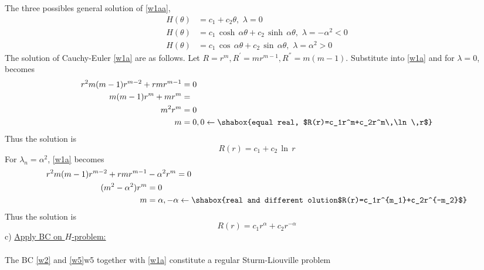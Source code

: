 The three possibles general solution of \eqref{w1aa},
\begin{align}
H(\theta)&=c_1+c_2\theta,\,\,\lambda=0\label{w1ab}\\
H(\theta)&=c_1\,\cosh\,\alpha\theta+c_2\,\sinh\,\alpha\theta,\,\,\lambda=-\alpha^2<0\label{w1ac}\\
H(\theta)&=c_1\,\cos\,\alpha\theta+c_2\,\sin\,\alpha\theta,\,\,\lambda=\alpha^2>0\label{w1ad}
\end{align}
The solution of Cauchy-Euler \eqref{w1a} are as follows. Let $R=r^m, R^{'}=mr^{m-1}, R^{''}=m(m-1)$. Substitute into \eqref{w1a} and for $\lambda=0$, becomes
\begin{align*}
r^2m(m-1)r^{m-2}+rmr^{m-1}&=0\\
m(m-1)r^m+mr^{m}&=\\
m^2r^m&=0\\
m&=0,0\leftarrow\shabox{equal real, $R(r)=c_1r^m+c_2r^m\,\ln\,r$}
\end{align*}
Thus the solution is
\begin{equation}
R(r)=c_1+c_2\,\ln\,r\label{swr1}
\end{equation}
For $\lambda_n=\alpha^2$, \eqref{w1a} becomes
\begin{align*}
r^2m(m-1)r^{m-2}+rmr^{m-1}&-\alpha^2 r^m=0\\
(m^2-\alpha^2)r^m&=0\\
m&=\alpha, -\alpha\leftarrow\shabox{real and different olution$R(r)=c_1r^{m_1}+c_2r^{-m_2}$}
\end{align*}
Thus the solution is
\begin{equation}
R(r)=c_1r^\alpha+c_2r^{-\alpha}\label{swr2}
\end{equation}
c) \underline{Apply BC on $H$-problem:}\\
\\
The BC \eqref{w2} and \eqref{w5}{w5} together with \eqref{w1a}  constitute a regular Sturm-Liouville problem\\


